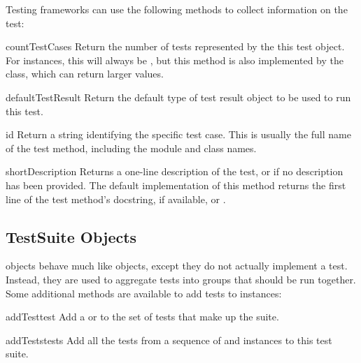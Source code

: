Testing frameworks can use the following methods to collect
information on the test:

\begin{methoddesc}[TestCase]{countTestCases}{}
  Return the number of tests represented by the this test object.  For
   instances, this will always be , but this
  method is also implemented by the  class, which can
  return larger values.
\end{methoddesc}

\begin{methoddesc}[TestCase]{defaultTestResult}{}
  Return the default type of test result object to be used to run this
  test.
\end{methoddesc}

\begin{methoddesc}[TestCase]{id}{}
  Return a string identifying the specific test case.  This is usually
  the full name of the test method, including the module and class
  names.
\end{methoddesc}

\begin{methoddesc}[TestCase]{shortDescription}{}
  Returns a one-line description of the test, or  if no
  description has been provided.  The default implementation of this
  method returns the first line of the test method's docstring, if
  available, or .
\end{methoddesc}


\subsection{TestSuite Objects
            \label{testsuite-objects}}

 objects behave much like  objects,
except they do not actually implement a test.  Instead, they are used
to aggregate tests into groups that should be run together.  Some
additional methods are available to add tests to 
instances:

\begin{methoddesc}[TestSuite]{addTest}{test}
  Add a  or  to the set of tests that
  make up the suite.
\end{methoddesc}

\begin{methoddesc}[TestSuite]{addTests}{tests}
  Add all the tests from a sequence of  and
   instances to this test suite.
\end{methoddesc}

